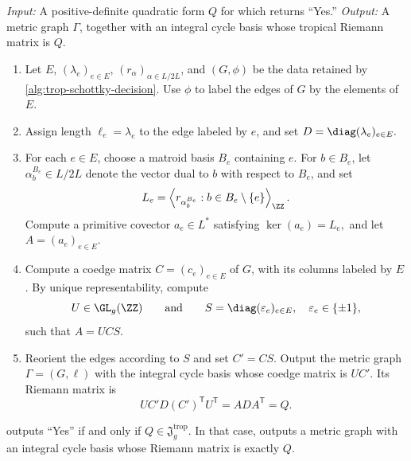 \documentclass[11pt,letterpaper]{amsart}
\begin{document}
\begin{alg}
\label{alg:trop-schottky-recovery}
\emph{Input:} A positive-definite quadratic form $Q$ for which
 returns ``Yes.''
\emph{Output:} A metric graph $\Gamma$, together with an integral
cycle basis whose tropical Riemann matrix is $Q$.

\begin{enumerate}

    \item Let $E$, $(\lambda_e)_{e\in E}$, $(r_\alpha)_{\alpha\in L/2L}$, and $(G,\phi)$ be the data retained by \cref{alg:trop-schottky-decision}. Use $\phi$ to label the edges of $G$ by the elements of $E$.

    \item
    Assign length $\ell_e=\lambda_e$ to the edge labeled by $e$, and set $D=\diag(\lambda_e)_{e\in E}.$

    \item
    For each $e\in E$, choose a matroid basis $B_e$ containing $e$.
    For $b\in B_e$, let $\alpha_b^{B_e}\in L/2L$ denote the vector dual to $b$ with respect to $B_e$, and set
    \[
        L_e
        =
        \left\langle
            r_{\alpha_b^{B_e}}
            :
            b\in B_e\setminus\{e\}
        \right\rangle_{\ZZ}.
    \]
    Compute a primitive covector $a_e\in L^*$ satisfying $\ker(a_e)=L_e,$
    and let $A=(a_e)_{e\in E}.$

    \item
    Compute a coedge matrix $C=(c_e)_{e\in E}$ of $G$, with its columns labeled by $E$. By unique
    representability, compute
    \[
        U\in\GL_g(\ZZ)
        \qquad\text{and}\qquad
        S=\diag(\varepsilon_e)_{e\in E},
        \quad \varepsilon_e\in\{\pm1\},
    \]
    such that $A=UCS.$
    \item
    Reorient the edges according to $S$ and set $C'=CS$. Output
    the metric graph $\Gamma=(G,\ell)$ with the integral cycle basis whose coedge matrix is $UC'$.
    Its Riemann matrix is
    \[
        U C'D(C')^{\mathsf T}U^{\mathsf T}
        =
        A D A^{\mathsf T}
        =
        Q.
    \]
\end{enumerate}
\end{alg}

\begin{theorem}
\label{thm:schottky-algorithms-correct}
 outputs ``Yes'' if and only if
$Q\in\mathfrak{J}^{\mathrm{trop}}_g$. In that case,
 outputs a metric graph with an
integral cycle basis whose Riemann matrix is exactly $Q$.
\end{theorem}
\end{document}
